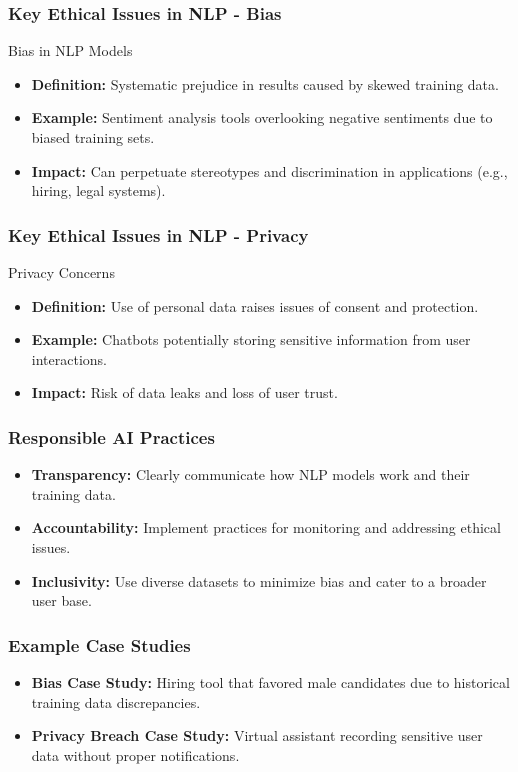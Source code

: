 \documentclass[aspectratio=169]{beamer}
\begin{document}
\begin{frame}
    \frametitle{Key Ethical Issues in NLP - Bias}
    \begin{block}{Bias in NLP Models}
        \begin{itemize}
            \item \textbf{Definition:} Systematic prejudice in results caused by skewed training data.
            \item \textbf{Example:} Sentiment analysis tools overlooking negative sentiments due to biased training sets.
            \item \textbf{Impact:} Can perpetuate stereotypes and discrimination in applications (e.g., hiring, legal systems).
        \end{itemize}
    \end{block}
\end{frame}

\begin{frame}
    \frametitle{Key Ethical Issues in NLP - Privacy}
    \begin{block}{Privacy Concerns}
        \begin{itemize}
            \item \textbf{Definition:} Use of personal data raises issues of consent and protection.
            \item \textbf{Example:} Chatbots potentially storing sensitive information from user interactions.
            \item \textbf{Impact:} Risk of data leaks and loss of user trust.
        \end{itemize}
    \end{block}
\end{frame}

\begin{frame}
    \frametitle{Responsible AI Practices}
    \begin{itemize}
        \item \textbf{Transparency:} Clearly communicate how NLP models work and their training data.
        \item \textbf{Accountability:} Implement practices for monitoring and addressing ethical issues.
        \item \textbf{Inclusivity:} Use diverse datasets to minimize bias and cater to a broader user base.
    \end{itemize}
\end{frame}

\begin{frame}
    \frametitle{Example Case Studies}
    \begin{itemize}
        \item \textbf{Bias Case Study:} Hiring tool that favored male candidates due to historical training data discrepancies.
        \item \textbf{Privacy Breach Case Study:} Virtual assistant recording sensitive user data without proper notifications.
    \end{itemize}
\end{frame}
\end{document}
